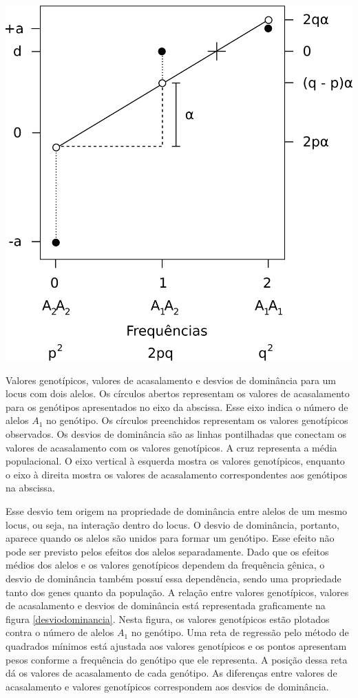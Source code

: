 \documentclass[portuges,]{tufte-handout}
\begin{document}
\begin{marginfigure}
\includegraphics{./figuras/desviodominancia.png}
\caption{Valores genotípicos, valores de acasalamento e desvios
de dominância para um locus com dois alelos. Os círculos abertos
representam os valores de acasalamento para os genótipos apresentados no
eixo da abscissa. Esse eixo indica o número de alelos \(A_1\) no
genótipo. Os círculos preenchidos representam os valores genotípicos
observados. Os desvios de dominância são as linhas pontilhadas que
conectam os valores de acasalamento com os valores genotípicos. A cruz
representa a média populacional. O eixo vertical à esquerda mostra os
valores genotípicos, enquanto o eixo à direita mostra os valores de
acasalamento correspondentes aos genótipos na abscissa.}
\label{desviodominancia}
\end{marginfigure}

Esse desvio tem origem na propriedade de dominância entre alelos de um
mesmo locus, ou seja, na interação dentro do locus. O desvio de
dominância, portanto, aparece quando os alelos são unidos para formar um
genótipo. Esse efeito não pode ser previsto pelos efeitos dos alelos
separadamente. Dado que os efeitos médios dos alelos e os valores
genotípicos dependem da frequência gênica, o desvio de dominância também
possuí essa dependência, sendo uma propriedade tanto dos genes quanto da
população. A relação entre valores genotípicos, valores de acasalamento
e desvios de dominância está representada graficamente na figura
\ref{desviodominancia}. Nesta figura, os valores genotípicos estão
plotados contra o número de alelos \(A_1\) no genótipo. Uma reta de
regressão pelo método de quadrados mínimos está ajustada aos valores
genotípicos e os pontos apresentam pesos conforme a frequência do
genótipo que ele representa. A posição dessa reta dá os valores de
acasalamento de cada genótipo. As diferenças entre valores de
acasalamento e valores genotípicos correspondem aos desvios de
dominância.
\end{document}
